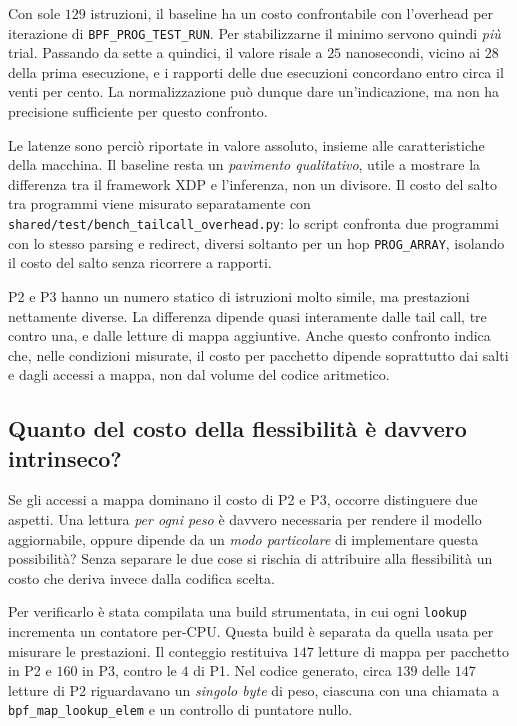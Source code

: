 \documentclass[binding=0.6cm,italian,oneside,noexaminfo]{sapthesis}
\begin{document}
Con sole $129$ istruzioni, il baseline ha un costo confrontabile con l'overhead per iterazione di \texttt{BPF\_PROG\_TEST\_RUN}. Per stabilizzarne il minimo servono quindi \emph{più} trial. Passando da sette a quindici, il valore risale a $25$ nanosecondi, vicino ai $28$ della prima esecuzione, e i rapporti delle due esecuzioni concordano entro circa il venti per cento. La normalizzazione può dunque dare un'indicazione, ma non ha precisione sufficiente per questo confronto.

Le latenze sono perciò riportate in valore assoluto, insieme alle caratteristiche della macchina. Il baseline resta un \emph{pavimento qualitativo}, utile a mostrare la differenza tra il framework XDP e l'inferenza, non un divisore. Il costo del salto tra programmi viene misurato separatamente con \texttt{shared/test/bench\_tail\-call\_overhead.py}: lo script confronta due programmi con lo stesso parsing e redirect, diversi soltanto per un hop \texttt{PROG\_ARRAY}, isolando il costo del salto senza ricorrere a rapporti.

P2 e P3 hanno un numero statico di istruzioni molto simile, ma prestazioni nettamente diverse. La differenza dipende quasi interamente dalle tail call, tre contro una, e dalle letture di mappa aggiuntive. Anche questo confronto indica che, nelle condizioni misurate, il costo per pacchetto dipende soprattutto dai salti e dagli accessi a mappa, non dal volume del codice aritmetico.
\newpage
\subsection{Quanto del costo della flessibilità è davvero intrinseco?}
\label{sec:blocco-pesi}

Se gli accessi a mappa dominano il costo di P2 e P3, occorre distinguere due aspetti. Una lettura \emph{per ogni peso} è davvero necessaria per rendere il modello aggiornabile, oppure dipende da un \emph{modo particolare} di implementare questa possibilità? Senza separare le due cose si rischia di attribuire alla flessibilità un costo che deriva invece dalla codifica scelta.

Per verificarlo è stata compilata una build strumentata, in cui ogni \texttt{lookup} incrementa un contatore per-CPU. Questa build è separata da quella usata per misurare le prestazioni. Il conteggio restituiva $147$ letture di mappa per pacchetto in P2 e $160$ in P3, contro le $4$ di P1. Nel codice generato, circa $139$ delle $147$ letture di P2 riguardavano un \emph{singolo byte} di peso, ciascuna con una chiamata a \texttt{bpf\_map\_lookup\_elem} e un controllo di puntatore nullo.
\end{document}
